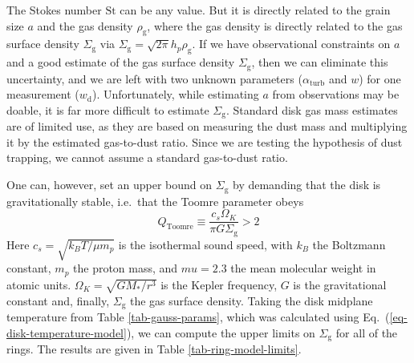 \documentclass{aa}
\begin{document}
The Stokes number $\mathrm{St}$ can be any value. But it is directly related to
the grain size $a$ and the gas density $\rho_{\mathrm{g}}$, where the gas
density is directly related to the gas surface density $\Sigma_{\mathrm{g}}$ via
$\Sigma_{\mathrm{g}}=\sqrt{2\pi}h_p\rho_{\mathrm{g}}$. If we have observational
constraints on $a$ and a good estimate of the gas surface density
$\Sigma_{\mathrm{g}}$, then we can eliminate this uncertainty, and we are left
with two unknown parameters ($\alpha_{\mathrm{turb}}$ and $w$) for one
measurement ($w_{\mathrm{d}}$).  Unfortunately, while estimating $a$ from
observations may be doable, it is far more difficult to estimate
$\Sigma_{\mathrm{g}}$. Standard disk gas mass estimates are of limited use, as
they are based on measuring the dust mass and multiplying it by the estimated
gas-to-dust ratio. Since we are testing the hypothesis of dust trapping, we
cannot assume a standard gas-to-dust ratio.

One can, however, set an upper bound on $\Sigma_{\mathrm{g}}$ by demanding that
the disk is gravitationally stable, i.e.\ that the Toomre parameter obeys
\begin{equation}
Q_{\mathrm{Toomre}}\equiv \frac{c_s\Omega_K}{\pi G \Sigma_{\mathrm{g}}} >2
\end{equation}
Here $c_s=\sqrt{k_BT/\mu m_p}$ is the isothermal sound speed, with $k_B$ the
Boltzmann constant, $m_p$ the proton mass, and $mu=2.3$ the mean molecular
weight in atomic units. $\Omega_K=\sqrt{GM_{*}/r^3}$ is the Kepler frequency,
$G$ is the gravitational constant and, finally, $\Sigma_{\mathrm{g}}$ the gas
surface density. Taking the disk midplane
temperature from Table \ref{tab-gauss-params}, which was calculated using
Eq.~(\ref{eq-disk-temperature-model}), we can compute the upper limits on
$\Sigma_{\mathrm{g}}$ for all of the rings. The results are given in Table
\ref{tab-ring-model-limits}.
\end{document}
